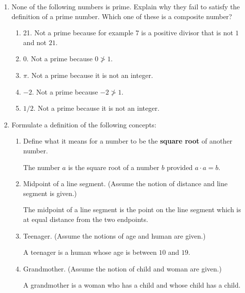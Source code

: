 \documentclass[11pt]{preprint}
\newtheorem{Solution}{Solution}
\begin{document}
\begin{enumerate}
\begin{Solution}
Since $c|a$ and $c|b$, there are integers $k_1$ and $k_2$ such that $a=k_1c$ and $b=k_2c$. Then
\[
a+b=k_1c+k_2c=(k_1+k_2)c.
\]
As $k_1+k_2$ is an integer, this means that $c|(a+b)$ and the claim is proved.
\end{Solution}
\newpage
\item None of the following numbers is prime. Explain why they fail to satisfy the definition of a prime number. Which one of these is a composite number?
\begin{enumerate}
\item 21. Not a prime because for example $7$ is a positive divisor that is not $1$ and not $21$.
\item 0. Not a prime because $0\not> 1$.
\item $\pi$. Not a prime because it is not an integer.
\item $-2$. Not a prime because $-2\not> 1$.
\item $1/2$. Not a prime because it is not an integer.
\end{enumerate}


\item Formulate a definition of the following concepts:
\begin{enumerate}
\item Define what it means for a number to be the \textbf{square root} of another number.

\vspace{0.4cm}
The number $a$ is the square root of a number $b$ provided $a\cdot a = b$.
\vspace{0.4cm}

\item Midpoint of a line segment. (Assume the notion of distance and line segment is given.)

\vspace{0.4cm}
The midpoint of a line segment is the point on the line segment which is at equal distance from the two endpoints.
\vspace{0.4cm}
\item Teenager. (Assume the notions of age and human are given.)

\vspace{0.4cm}
A teenager is a human whose age is between $10$ and $19$.
\vspace{0.4cm}

\item Grandmother. (Assume the notion of child and woman are given.)

\vspace{0.4cm}
A grandmother is a woman who has a child and whose child has a child.
\end{enumerate}


\end{enumerate}
\end{document}
